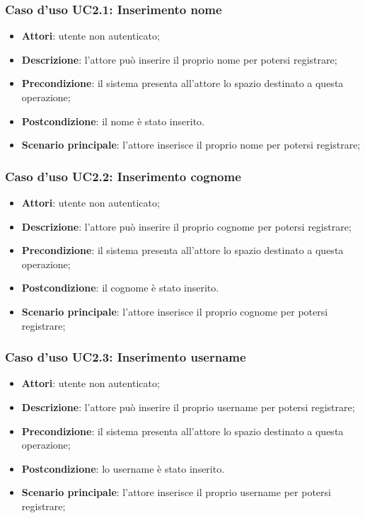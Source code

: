 \subsubsection{Caso d'uso UC2.1: Inserimento nome}
\begin{itemize}
\item \textbf{Attori}: utente non autenticato;
\item \textbf{Descrizione}: l'attore può inserire il proprio nome per potersi registrare;
\item \textbf{Precondizione}: il sistema presenta all'attore lo spazio destinato a questa operazione;
\item \textbf{Postcondizione}: il nome è stato inserito.
\item \textbf{Scenario principale}: l'attore inserisce il proprio nome per potersi registrare;
\end{itemize}

\subsubsection{Caso d'uso UC2.2: Inserimento cognome}
\begin{itemize}
\item \textbf{Attori}: utente non autenticato;
\item \textbf{Descrizione}: l'attore può inserire il proprio cognome per potersi registrare;
\item \textbf{Precondizione}: il sistema presenta all'attore lo spazio destinato a questa operazione;
\item \textbf{Postcondizione}: il cognome è stato inserito.
\item \textbf{Scenario principale}: l'attore inserisce il proprio cognome per potersi registrare;
\end{itemize}

\subsubsection{Caso d'uso UC2.3: Inserimento username}
\begin{itemize}
\item \textbf{Attori}: utente non autenticato;
\item \textbf{Descrizione}: l'attore può inserire il proprio username per potersi registrare;
\item \textbf{Precondizione}: il sistema presenta all'attore lo spazio destinato a questa operazione;
\item \textbf{Postcondizione}: lo username è stato inserito.
\item \textbf{Scenario principale}: l'attore inserisce il proprio username per potersi registrare;
\end{itemize}

